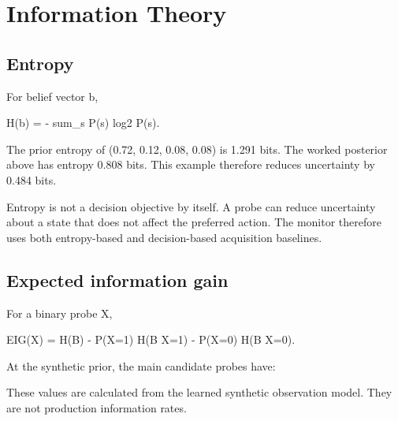 \documentclass{article}
\begin{document}
\section{Information Theory}

\subsection{Entropy}

For belief vector b,

H(b) = - sum\_s P(s) log2 P(s).

The prior entropy of (0.72, 0.12, 0.08, 0.08) is 1.291 bits. The worked posterior above has entropy 0.808 bits. This example therefore reduces uncertainty by 0.484 bits.

Entropy is not a decision objective by itself. A probe can reduce uncertainty about a state that does not affect the preferred action. The monitor therefore uses both entropy-based and decision-based acquisition baselines.

\subsection{Expected information gain}

For a binary probe X,

EIG(X) = H(B) - P(X=1) H(B \textbar{} X=1) - P(X=0) H(B \textbar{} X=0).

At the synthetic prior, the main candidate probes have:

\begin{table}[t]
\centering
\scriptsize
{}
\caption{Expected information gain of candidate probes at the prior.}
\end{table}


These values are calculated from the learned synthetic observation model. They are not production information rates.
\end{document}
